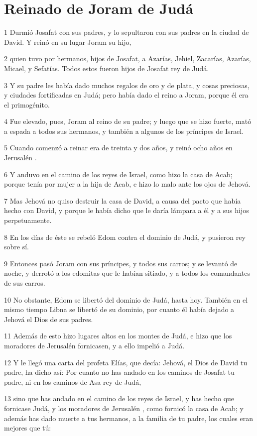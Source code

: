 \section*{Reinado de Joram de Judá}

\par 1 Durmió Josafat con sus padres, y lo sepultaron con sus padres en la ciudad de David. Y reinó en su lugar Joram su hijo,
\par 2 quien tuvo por hermanos, hijos de Josafat, a Azarías, Jehiel, Zacarías, Azarías, Micael, y Sefatías. Todos estos fueron hijos de Josafat rey de Judá.
\par 3 Y su padre les había dado muchos regalos de oro y de plata, y cosas preciosas, y ciudades fortificadas en Judá; pero había dado el reino a Joram, porque él era el primogénito.
\par 4  Fue  elevado, pues, Joram al reino de su padre; y luego que se hizo fuerte, mató a espada a todos sus hermanos, y también a algunos de los príncipes de Israel.
\par 5 Cuando comenzó a reinar era de treinta y dos años, y reinó ocho años en Jerusalén .
\par 6 Y anduvo en el camino de los reyes de Israel, como hizo la casa de Acab; porque tenía por mujer a la hija de Acab, e hizo lo malo ante los ojos de Jehová.
\par 7 Mas Jehová no quiso destruir la casa de David, a causa del pacto que había hecho con David, y porque le había dicho que le daría lámpara a él y a sus hijos perpetuamente. 
\par 8 En los días de éste se rebeló Edom contra el dominio de Judá, y pusieron rey sobre sí.
\par 9 Entonces pasó Joram con sus príncipes, y todos sus carros; y se levantó de noche, y derrotó a los edomitas que le habían sitiado, y a todos los comandantes de sus carros.
\par 10 No obstante, Edom se libertó del dominio de Judá, hasta hoy. También en el mismo tiempo Libna se libertó de su dominio, por cuanto él había dejado a Jehová el Dios de sus padres. 
\par 11 Además de esto hizo lugares altos en los montes de Judá, e hizo que los moradores de Jerusalén  fornicasen, y a ello impelió a Judá.
\par 12 Y le llegó una carta del profeta Elías, que decía: Jehová, el Dios de David tu padre, ha dicho así: Por cuanto no has andado en los caminos de Josafat tu padre, ni en los caminos de Asa rey de Judá,
\par 13 sino que has andado en el camino de los reyes de Israel, y has hecho que fornicase Judá, y los moradores de Jerusalén , como fornicó la casa de Acab; y además has dado muerte a tus hermanos, a la familia de tu padre, los cuales eran mejores que tú:
